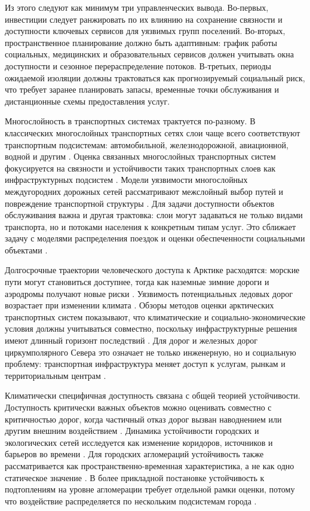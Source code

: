 Из этого следуют как минимум три управленческих вывода. Во-первых,
инвестиции следует ранжировать по их влиянию на сохранение связности и
доступности ключевых сервисов для уязвимых групп поселений. Во-вторых,
пространственное планирование должно быть адаптивным: график работы
социальных, медицинских и образовательных сервисов должен учитывать окна
доступности и сезонное перераспределение потоков. В-третьих, периоды
ожидаемой изоляции должны трактоваться как прогнозируемый социальный риск, что
требует заранее планировать запасы, временные точки обслуживания и
дистанционные схемы предоставления услуг.

Многослойность в транспортных системах трактуется по-разному. В классических многослойных транспортных сетях слои чаще всего соответствуют транспортным подсистемам: автомобильной, железнодорожной, авиационной, водной и другим \cite{li2025multilayerReview}. Оценка связанных многослойных транспортных систем фокусируется на связности и устойчивости таких транспортных слоев как инфраструктурных подсистем \cite{mei2025multilayerRobustness}. Модели уязвимости многослойных междугородних дорожных сетей рассматривают межслойный выбор путей и повреждение транспортной структуры \cite{ye2025multilayerIntercityRoad}. Для задачи доступности объектов обслуживания важна и другая трактовка: слои могут задаваться не только видами транспорта, но и потоками населения к конкретным типам услуг. Это сближает задачу с моделями распределения поездок и оценки обеспеченности социальными объектами \cite{mishina2024urbanAccessibility}.

Долгосрочные траектории человеческого доступа к Арктике расходятся: морские пути могут становиться доступнее, тогда как наземные зимние дороги и аэродромы получают новые риски \cite{stephenson2011arcticAccess}. Уязвимость потенциальных ледовых дорог возрастает при изменении климата \cite{dong2025iceRoads}. Обзоры методов оценки арктических транспортных систем показывают, что климатические и социально-экономические условия должны учитываться совместно, поскольку инфраструктурные решения имеют длинный горизонт последствий \cite{waite2023arcticTransport}. Для дорог и железных дорог циркумполярного Севера это означает не только инженерную, но и социальную проблему: транспортная инфраструктура меняет доступ к услугам, рынкам и территориальным центрам \cite{povoroznyuk2022arcticRoads}.

Климатически специфичная доступность связана с общей теорией устойчивости. Доступность критически важных объектов можно оценивать совместно с критичностью дорог, когда частичный отказ дорог вызван наводнением или другим внешним воздействием \cite{gangwal2023criticalFacility}. Динамика устойчивости городских и экологических сетей исследуется как изменение коридоров, источников и барьеров во времени \cite{huang2022ecologicalNetwork}. Для городских агломераций устойчивость также рассматривается как пространственно-временная характеристика, а не как одно статическое значение \cite{lu2022urbanAgglomResilience}. В более прикладной постановке устойчивость к подтоплениям на уровне агломерации требует отдельной рамки оценки, потому что воздействие распределяется по нескольким подсистемам города \cite{ji2024urbanFloodResilience}.


